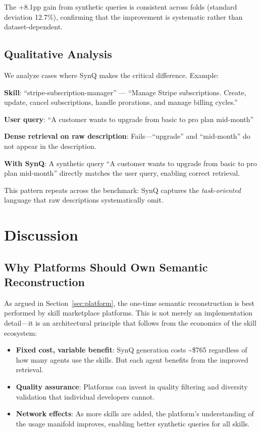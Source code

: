 \documentclass[11pt,a4paper]{article}
\begin{document}
The +8.1pp gain from synthetic queries is consistent across folds (standard deviation 12.7\%), confirming that the improvement is systematic rather than dataset-dependent.

\subsection{Qualitative Analysis}

We analyze cases where SynQ makes the critical difference. Example:

\textbf{Skill}: ``stripe-subscription-manager'' --- ``Manage Stripe subscriptions. Create, update, cancel subscriptions, handle prorations, and manage billing cycles.''

\textbf{User query}: ``A customer wants to upgrade from basic to pro plan mid-month''

\textbf{Dense retrieval on raw description}: Fails---``upgrade'' and ``mid-month'' do not appear in the description.

\textbf{With SynQ}: A synthetic query ``A customer wants to upgrade from basic to pro plan mid-month'' directly matches the user query, enabling correct retrieval.

This pattern repeats across the benchmark: SynQ captures the \emph{task-oriented} language that raw descriptions systematically omit.

\section{Discussion}
\label{sec:discussion}

\subsection{Why Platforms Should Own Semantic Reconstruction}

As argued in Section~\ref{sec:platform}, the one-time semantic reconstruction is best performed by skill marketplace platforms. This is not merely an implementation detail---it is an architectural principle that follows from the economics of the skill ecosystem:

\begin{itemize}
  \item \textbf{Fixed cost, variable benefit}: SynQ generation costs \textasciitilde\$765 regardless of how many agents use the skills. But each agent benefits from the improved retrieval.
  \item \textbf{Quality assurance}: Platforms can invest in quality filtering and diversity validation that individual developers cannot.
  \item \textbf{Network effects}: As more skills are added, the platform's understanding of the usage manifold improves, enabling better synthetic queries for all skills.
\end{itemize}
\end{document}

